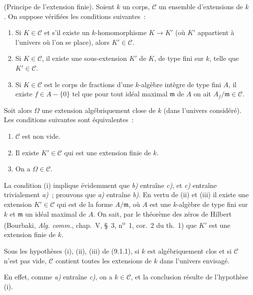 \begin{proposition}[9.1.1]
\label{IV.9.1.1-fr}
\textnormal{(Principe de l'extension finie).} Soient $k$ un corps,
$\mathcal C$ un ensemble d'extensions de $k$. On suppose vérifiées les
conditions suivantes~:
\begin{enumerate}[label=(\roman*)]
  \item Si $K\in\mathcal C$ et s'il existe un $k$-homomorphisme $K\to K'$
  (où $K'$ appartient à l'univers où l'on se place), alors
  $K'\in\mathcal C$.
  \item Si $K\in\mathcal C$, il existe une sous-extension $K'$ de $K$, de
  type fini sur $k$, telle que $K'\in\mathcal C$.
  \item Si $K\in\mathcal C$ est le corps de fractions d'une $k$-algèbre
  intègre de type fini $A$, il existe $f\in A-\{0\}$ tel que pour tout idéal
  maximal $\mathfrak m$ de $A$ on ait $A_f/\mathfrak m\in\mathcal C$.
\end{enumerate}
Soit alors $\Omega$ une extension algébriquement close de $k$ (dans l'univers
considéré). Les conditions suivantes sont équivalentes~:
\begin{enumerate}[label=\emph{\alph*)}]
  \item $\mathcal C$ est non vide.
  \item Il existe $K'\in\mathcal C$ qui est une extension finie de $k$.
  \item On a $\Omega\in\mathcal C$.
\end{enumerate}
\end{proposition}

La condition (i) implique évidemment que \emph{b)} entraîne \emph{c)}, et
\emph{c)} entraîne trivialement \emph{a)}~; prouvons que \emph{a)} entraîne
\emph{b)}. En vertu de (ii) et (iii) il existe une extension
$K'\in\mathcal C$ qui est de la forme $A/\mathfrak m$, où $A$ est une
$k$-algèbre de type fini sur $k$ et $\mathfrak m$ un idéal maximal de $A$.
On sait, par le théorème des zéros de Hilbert (Bourbaki, \emph{Alg. comm.},
chap.~V, \S~3, n\textsuperscript{o}~1, cor.~2 du th.~1) que $K'$ est une
extension finie de $k$.

\begin{corollary}[9.1.2]
\label{IV.9.1.2-fr}
Sous les hypothèses (i), (ii), (iii) de (9.1.1), si $k$ est algébriquement
clos et si $\mathcal C$ n'est pas vide, $\mathcal C$ contient toutes les
extensions de $k$ dans l'univers envisagé.
\end{corollary}

En effet, comme \emph{a)} entraîne \emph{c)}, on a $k\in\mathcal C$, et la
conclusion résulte de l'hypothèse (i).


